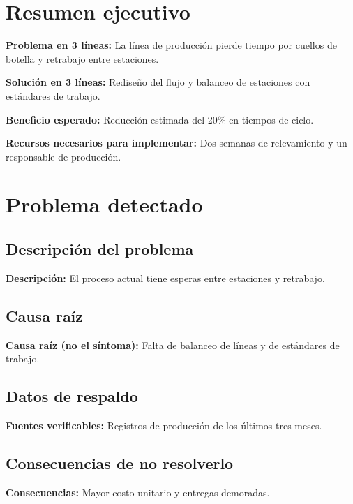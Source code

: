 \documentclass[11pt,a4paper]{article}
\newcommand{\campo}[2]{\noindent\textbf{\textcolor{irdblack}{#1:}} \textcolor{irdblack}{#2}\par\vspace{0.3em}}
\begin{document}
\tableofcontents
\newpage

\section{Resumen ejecutivo}

\begin{infobox}
\campo{Problema en 3 líneas}{La línea de producción pierde tiempo por cuellos de botella y retrabajo entre estaciones.}
\campo{Solución en 3 líneas}{Rediseño del flujo y balanceo de estaciones con estándares de trabajo.}
\campo{Beneficio esperado}{Reducción estimada del 20\% en tiempos de ciclo.}
\campo{Recursos necesarios para implementar}{Dos semanas de relevamiento y un responsable de producción.}
\end{infobox}

\section{Problema detectado}

\subsection{Descripción del problema}
\campo{Descripción}{El proceso actual tiene esperas entre estaciones y retrabajo.}

\subsection{Causa raíz}
\campo{Causa raíz (no el síntoma)}{Falta de balanceo de líneas y de estándares de trabajo.}

\subsection{Datos de respaldo}
\campo{Fuentes verificables}{Registros de producción de los últimos tres meses.}

\subsection{Consecuencias de no resolverlo}
\campo{Consecuencias}{Mayor costo unitario y entregas demoradas.}
\end{document}
